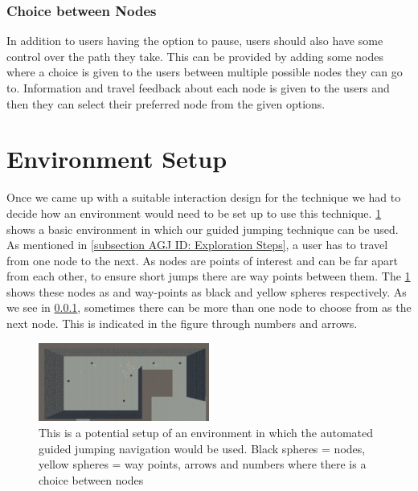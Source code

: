 \subsubsection{Choice between Nodes}
\label{subsubsection AGJ ID ES: Choice between Nodes}
In addition to users having the option to pause, users should also have some control over the path they take. This can be provided by adding some nodes where a choice is given to the users between multiple possible nodes they can go to. Information and travel feedback about each node is given to the users and then they can select their preferred node from the given options. 

\section{Environment Setup}
\label{section AGJ: Environment Setup}

Once we came up with a suitable interaction design for the technique we had to decide how an environment would need to be set up to use this technique. \cref{fig:interaction-design-layout} shows a basic environment in which our guided jumping technique can be used. As mentioned in \cref{subsection AGJ ID: Exploration Steps}, a user has to travel from one node to the next. As nodes are points of interest and can be far apart from each other, to ensure short jumps there are way points between them. The \cref{fig:interaction-design-layout} shows these nodes as and way-points as black and yellow spheres respectively. As we see in \cref{subsubsection AGJ ID ES: Choice between Nodes}, sometimes there can be more than one node to choose from as the next node. This is indicated in the figure through numbers and arrows.     
\begin{figure}[]
	\centering
	\includegraphics[width=0.5\textwidth]{images/interaction-design-layout.pdf} 
	\caption{This is a potential setup of an environment in which the automated guided jumping navigation would be used. Black spheres = nodes, yellow spheres = way points, arrows and numbers where there is a choice between nodes}
	\label{fig:interaction-design-layout}
\end{figure}

